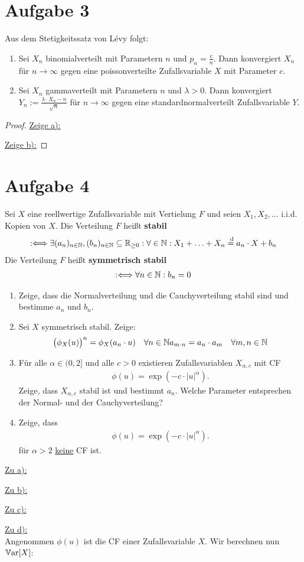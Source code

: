 \documentclass[12pt,a4paper]{article}
\begin{document}
\section*{Aufgabe 3}
Aus dem Stetigkeitssatz von Lévy folgt:
\begin{enumerate}[label=\alph*)]
	\item Sei $X_n$ binomialverteilt mit Parametern $n$ und $p_n=\frac{c}{n}$.
	Dann konvergiert $X_n$ für $n\to\infty$ gegen eine poissonverteilte Zufallsvariable $X$ mit Parameter $c$.
	\item Sei $X_n$ gammaverteilt mit Parametern $n$ und $\lambda>0$.
	Dann konvergiert $Y_n:=\frac{\lambda\cdot X_n-n}{\sqrt{n}}$ für $n\to\infty$ gegen eine standardnormalverteilt Zufallsvariable $Y$.
\end{enumerate}

\begin{proof}
	\underline{Zeige a):}
	
	\underline{Zeige b):}
\end{proof}

\section*{Aufgabe 4}
Sei $X$ eine reellwertige Zufallsvariable mit Vertielung $F$ und seien $X_1,X_2,\ldots$ i.i.d. Kopien von $X$.
Die Verteilung $F$ heißt \textbf{stabil}
\begin{align*}
	:\Longleftrightarrow
	\exists(a_n)_{n\in\mathbb{N}},(b_n)_{n\in\mathbb{N}}\subseteq\mathbb{R}_{\geq0}:\forall\in\mathbb{N}:
	X_1+\ldots+X_n\overset{\text{ d}}{=}a_n\cdot X+b_n
\end{align*}
Die Verteilung $F$ heißt \textbf{symmetrisch stabil}
\begin{align*}
	:\Longleftrightarrow
	\forall n\in\mathbb{N}:b_n=0
\end{align*}

\begin{enumerate}[label=\alph*)]
	\item Zeige, dass die Normalverteilung und die Cauchyverteilung stabil sind und bestimme $a_n$ und $b_n$.
	\item Sei $X$ symmetrisch stabil.
	Zeige:
	\begin{align*}
		\big(\phi_X(u)\big)^n&=\phi_X(a_n\cdot u) & \forall n\in\mathbb{N}
		a_{m\cdot n}&=a_n\cdot a_m &\forall m,n\in\mathbb{N}
	\end{align*}		
	\item Für alle $\alpha\in(0,2]$ und alle $c>0$ existieren Zufallsvariablen $X_{\alpha,c}$ mit CF 
	\begin{align*}
		\phi(u)=\exp\left(-c\cdot|u|^\alpha\right).
	\end{align*}
	Zeige, dass $X_{\alpha,c}$ stabil ist und bestimmt $a_n$.
	Welche Parameter entsprechen der Normal- und der Cauchyverteilung?
	\item Zeige, dass
	\begin{align*}
		\phi(u)=\exp\left(-c\cdot|u|^\alpha\right).
	\end{align*}
	für $\alpha>2$ \ul{keine} CF ist.
\end{enumerate}

\begin{lösung}
	\underline{Zu a):}
	
	\underline{Zu b):}
	
	\underline{Zu c):}
	
	\underline{Zu d):}\\
	Angenommen $\phi(u)$ ist die CF einer Zufallsvariable $X$.
	Wir berechnen nun $\mathbb{V}\text{ar}[X]$:
	
\end{lösung}
\end{document}
